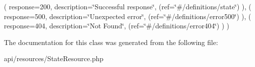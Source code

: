 ( response=200, description=\char`\"{}\+Successful response\char`\"{}, (ref=\char`\"{}\#/definitions/state\char`\"{}) ), ( response=500, description=\char`\"{}\+Unexpected error\char`\"{}, (ref=\char`\"{}\#/definitions/error500\char`\"{}) ), ( response=404, description=\char`\"{}\+Not Found\char`\"{}, (ref=\char`\"{}\#/definitions/error404\char`\"{}) ) ) 


The documentation for this class was generated from the following file\+:\begin{DoxyCompactItemize}
\item 
api/resources/State\+Resource.\+php\end{DoxyCompactItemize}
